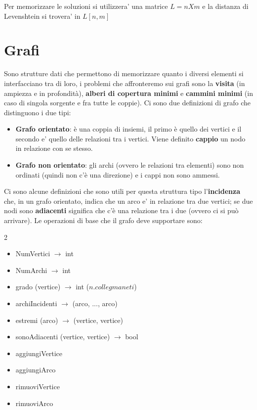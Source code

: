 \documentclass{article}
\begin{document}
Per memorizzare le soluzioni si utilizzera' una matrice $L=nXm$ e la distanza di Levenshtein si trovera' in $L[n,m]$


\section{Grafi}
Sono strutture dati che permettono di memorizzare quanto i diversi elementi si interfacciano tra di loro, 
i problemi che affronteremo sui grafi sono la \textbf{visita} (in ampiezza e in profondità), \textbf{alberi di copertura minimi} e \textbf{cammini minimi} (in caso di singola sorgente e fra tutte le coppie).
Ci sono due definizioni di grafo che distinguono i due tipi:
\begin{itemize}
    \item \textbf{Grafo orientato}: è una coppia di insiemi, il primo è quello dei vertici e il secondo e' quello delle relazioni tra i vertici. 
    Viene definito \textbf{cappio} un nodo in relazione con se stesso.
    \item \textbf{Grafo non orientato}: gli archi (ovvero le relazioni tra elementi) sono non ordinati (quindi non c'è una direzione) e i cappi non sono ammessi.
\end{itemize}
Ci sono alcune definizioni che sono utili per questa struttura tipo l'\textbf{incidenza} che, in un grafo orientato, indica che un arco e' in relazione tra due vertici; 
se due nodi sono \textbf{adiacenti} significa che c'è una relazione tra i due (ovvero ci si può arrivare).
Le operazioni di base che il grafo deve supportare sono:
\begin{multicols}{2}
\begin{itemize}
    \item NumVertici $\to$ int
    \item NumArchi $\to$ int
    \item grado (vertice) $\to$ int ($n.collegmaneti$)
    \item archiIncidenti $\to$ (arco, ..., arco)
    \item estremi (arco) $\to$ (vertice, vertice)
    \item sonoAdiacenti (vertice, vertice) $\to$ bool
    \item aggiungiVertice 
    \item aggiungiArco
    \item rimuoviVertice
    \item rimuoviArco
\end{itemize}
\end{multicols}
\end{document}
